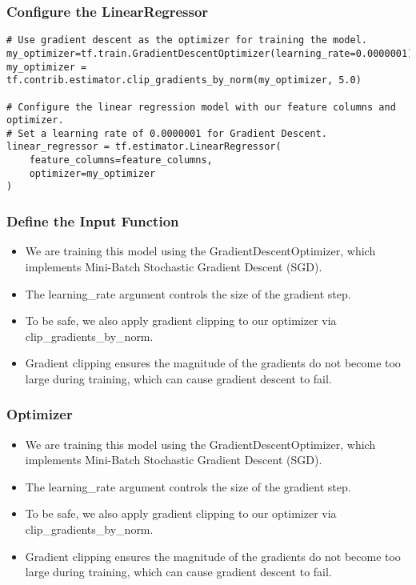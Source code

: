 \begin{frame}[fragile]\frametitle{Configure the LinearRegressor}
\begin{lstlisting}
# Use gradient descent as the optimizer for training the model.
my_optimizer=tf.train.GradientDescentOptimizer(learning_rate=0.0000001)
my_optimizer = tf.contrib.estimator.clip_gradients_by_norm(my_optimizer, 5.0)

# Configure the linear regression model with our feature columns and optimizer.
# Set a learning rate of 0.0000001 for Gradient Descent.
linear_regressor = tf.estimator.LinearRegressor(
    feature_columns=feature_columns,
    optimizer=my_optimizer
)
\end{lstlisting}

\end{frame}

\begin{frame}[fragile]\frametitle{Define the Input Function}
\begin{itemize}
\item  We are training this model using the GradientDescentOptimizer, which implements Mini-Batch Stochastic Gradient Descent (SGD). 
\item The learning\_rate argument controls the size of the gradient step.
\item To be safe, we also apply gradient clipping to our optimizer via clip\_gradients\_by\_norm. 
\item Gradient clipping ensures the magnitude of the gradients do not become too large during training, which can cause gradient descent to fail.
\end{itemize}
\end{frame}

\begin{frame}[fragile]\frametitle{Optimizer}
\begin{itemize}
\item  We are training this model using the GradientDescentOptimizer, which implements Mini-Batch Stochastic Gradient Descent (SGD). 
\item The learning\_rate argument controls the size of the gradient step.
\item To be safe, we also apply gradient clipping to our optimizer via clip\_gradients\_by\_norm. 
\item Gradient clipping ensures the magnitude of the gradients do not become too large during training, which can cause gradient descent to fail.
\end{itemize}
\end{frame}


